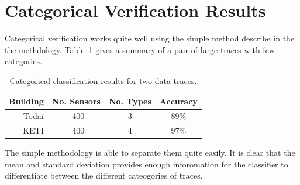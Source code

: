 \section{Categorical Verification Results}

Categorical verification works quite well using the simple method describe in the the methdology.  Table~\ref{tab:type_class}
gives a summary of a pair of large traces with few categories.

\begin{table}[h]
\begin{center}
\begin{tabular}{| r | c | c | c |}
	\hline
	\textbf{Building} & \textbf{No. Sensors} & \textbf{No. Types} & \textbf{Accuracy}\\ \hline
	Todai & ~400 & 3 & 89\%    \\ \hline

	KETI & ~400 & 4 & 97\% 	 	\\ \hline

\end{tabular}
\caption{Categorical classification results for two data traces.}
\label{tab:type_class}
\end{center}
\end{table}

The simple methodology is able to separate them quite easily.  It is clear that the mean and standard deviation provides enough
inforomation for the classifier to differentiate between the different cateogories of traces.





